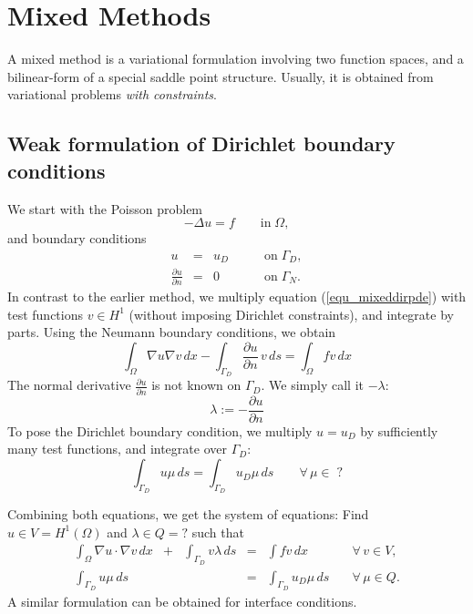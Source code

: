 \chapter{Mixed Methods}

A mixed method is a variational formulation involving two function spaces, 
and a bilinear-form of a special saddle point structure. Usually, it is
obtained from variational problems {\em with constraints}.

\section{Weak formulation of Dirichlet boundary conditions}

We start with the Poisson problem
\begin{equation} \label{equ_mixeddirpde}
-\Delta u = f \qquad \mbox{in} \; \Omega,
\end{equation}
and boundary conditions
$$
\begin{array}{rcll}
u & = & u_D \qquad & \mbox{on} \; \Gamma_D, \\
\frac{\partial u}{\partial n} & = & 0 & \mbox{on} \; \Gamma_N.
\end{array}
$$
In contrast to the earlier method, we multiply equation (\ref{equ_mixeddirpde})
with test functions $v \in H^1$ (without imposing Dirichlet constraints), 
and integrate by parts. Using the Neumann boundary conditions, we obtain
$$
\int_\Omega \nabla u \nabla v \, dx - \int_{\Gamma_D} \frac{\partial u}{\partial n} \, v \, ds = \int_\Omega f v \, dx
$$
The normal derivative $\frac{\partial u}{\partial n}$ is not known on $\Gamma_D$. We simply call it $-\lambda$:
$$
\lambda := - \frac{\partial u }{\partial n}
$$
To pose the Dirichlet boundary condition, we multiply $u = u_D$ by sufficiently many test functions, and integrate over $\Gamma_D$:
$$
\int_{\Gamma_D} u \mu \, ds = \int_{\Gamma_D} u_D \mu \, ds \qquad \forall \, 
\mu \in \; ?
$$

Combining both equations, we get the system of equations:
Find $u \in V = H^1(\Omega)$ and $\lambda \in Q = ?$ such
that
\begin{equation} \label{equ_mixeddirichlet}
\begin{array}{ccccll}
\int_\Omega \nabla u \cdot \nabla v \, dx & + & \int_{\Gamma_D} v \lambda \, ds & = & \int f v \, dx \quad & \forall \, v \in V, \\[0.5em]
\int_{\Gamma_D} u \mu \, ds & & & = & \int_{\Gamma_D} u_D \mu \, ds \quad & \forall \, \mu \in Q.
\end{array}
\end{equation}
A similar formulation can be obtained for interface conditions.

